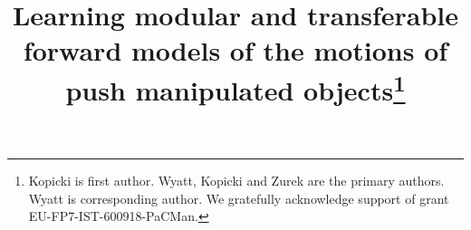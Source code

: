 %
%
%
%
%
%
\RequirePackage{fix-cm}
%
\documentclass[natbib,twocolumn]{svjour3}          %
%
\smartqed  %
%
\usepackage{graphicx}
%
%
\usepackage{amsmath,amssymb,amsbsy}
\usepackage{algorithm}
\usepackage{graphicx}
\usepackage{epstopdf}
\usepackage{algorithmic}
\usepackage{stackengine}

%
\newcommand{\Ex}{\mathop{\mathbb E\/}}
\newcommand{\argmax}[1]{\underset{#1}{\operatorname{argmax}}\medspace}

%


\title{Learning modular and transferable forward models of the motions of push manipulated objects\thanks{Kopicki is first author. Wyatt, Kopicki and Zurek are the primary authors. Wyatt is corresponding author. We gratefully acknowledge support of grant EU-FP7-IST-600918-PaCMan.}
}

